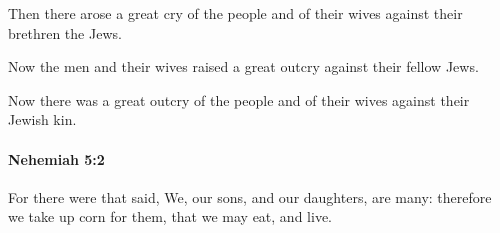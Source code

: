 			\begin{versebox}
					\item[BHS] 
					\item[LXX] 
					\item[ASV] Then there arose a great cry of the people and of their wives against their brethren the Jews.
					\item[NIV] Now the men and their wives raised a great outcry against their fellow Jews.
					\item[NRSV] Now there was a great outcry of the people and of their wives against their Jewish kin.
			\end{versebox}

		\paragraph{Nehemiah 5:2} %
			\label{NEHEMIAH-5-2}

			For there were that said, We, our sons, and our daughters, are many: therefore we take up corn for them, that we may eat, and live.

